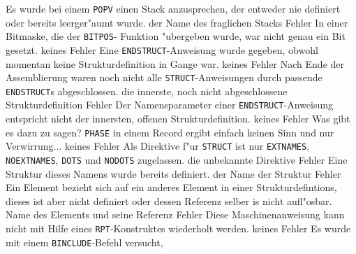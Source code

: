 \documentclass[12pt,a4paper,twoside]{report}
\newcommand{\tty}[1]{{\tt #1}}
\begin{document}
\begin{description}
               {Es wurde bei einem \tty{POPV}
                einen Stack anzusprechen, der entweder nie definiert oder
                bereits leerger"aumt wurde.}
               {der Name des fraglichen Stacks}
	       {Fehler}
               {In einer Bitmaske, die der \tty{BITPOS}-
                Funktion "ubergeben wurde, war nicht genau ein Bit
                gesetzt.}
               {keines}
               {Fehler}
               {Eine \tty{ENDSTRUCT}-Anweisung wurde gegeben, obwohl
                momentan keine Strukturdefinition in Gange war.}
               {keines}
               {Fehler}
               {Nach Ende der Assemblierung waren noch nicht alle
                \tty{STRUCT}-Anweisungen durch passende \tty{ENDSTRUCT}s
                abgeschlossen.}
               {die innerste, noch nicht abgeschlossene
                Strukturdefinition}
               {Fehler}
               {Der Namensparameter einer \tty{ENDSTRUCT}-Anweisung
                entspricht nicht der innersten, offenen
                Strukturdefinition.}
               {keines}
               {Fehler}
               {Was gibt es dazu zu sagen?  \tty{PHASE} in einem Record
                ergibt einfach keinen Sinn und nur Verwirrung...}
               {keines}
\errentry{1554}{ung"ultige \tty{STRUCT}-Direktive}
               {Fehler}
               {Als Direktive f"ur \tty{STRUCT} ist nur
                \tty{EXTNAMES}, \tty{NOEXTNAMES}, \tty{DOTS} und
                \tty{NODOTS} zugelassen.}
               {die unbekannte Direktive}
               {Fehler}
               {Eine Struktur dieses Namens wurde bereits definiert.}
               {der Name der Struktur}
               {Fehler}
               {Ein Element bezieht sich auf ein anderes Element in
                einer Strukturdefintions, dieses ist aber nicht
                definiert oder dessen Referenz selber is nicht
                aufl"osbar.}
               {Name des Elements und seine Referenz}
               {Fehler}
               {Diese Maschinenanweisung kann nicht mit Hilfe eines
                {\tt RPT}-Konstruktes wiederholt werden.}
               {keines}
               {Fehler}
               {Es wurde mit einem \tty{BINCLUDE}-Befehl versucht,
}
\end{description}
\end{document}
